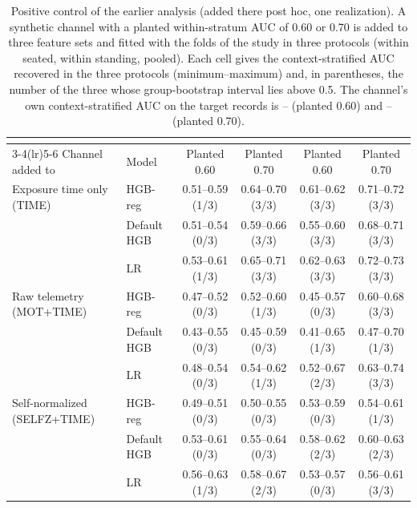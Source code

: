 \begin{table}[t]
\centering
\footnotesize
\caption{Positive control of the earlier analysis (added there post hoc, one realization). A synthetic channel with a planted within-stratum AUC of 0.60 or 0.70 is added to three feature sets and fitted with the folds of the study in three protocols (within seated, within standing, pooled). Each cell gives the context-stratified AUC recovered in the three protocols (minimum--maximum) and, in parentheses, the number of the three whose group-bootstrap interval lies above 0.5. The channel's own context-stratified AUC on the target records is -- (planted 0.60) and -- (planted 0.70).}
\label{tab:posctl}
\setlength{\tabcolsep}{4pt}
\begin{tabular}{@{}llcccc@{}}
\toprule
 & & \multicolumn{2}{c}{\sevtwo{}} & \multicolumn{2}{c}{\sevone{}} \\ \cmidrule(lr){3-4}\cmidrule(lr){5-6}
Channel added to & Model & Planted 0.60 & Planted 0.70 & Planted 0.60 & Planted 0.70 \\
\midrule
Exposure time only (TIME) & HGB-reg & 0.51--0.59 (1/3) & 0.64--0.70 (3/3) & 0.61--0.62 (3/3) & 0.71--0.72 (3/3) \\
 & Default HGB & 0.51--0.54 (0/3) & 0.59--0.66 (3/3) & 0.55--0.60 (3/3) & 0.68--0.71 (3/3) \\
 & LR & 0.53--0.61 (1/3) & 0.65--0.71 (3/3) & 0.62--0.63 (3/3) & 0.72--0.73 (3/3) \\
Raw telemetry (MOT+TIME) & HGB-reg & 0.47--0.52 (0/3) & 0.52--0.60 (1/3) & 0.45--0.57 (0/3) & 0.60--0.68 (3/3) \\
 & Default HGB & 0.43--0.55 (0/3) & 0.45--0.59 (0/3) & 0.41--0.65 (1/3) & 0.47--0.70 (1/3) \\
 & LR & 0.48--0.54 (0/3) & 0.54--0.62 (1/3) & 0.52--0.67 (2/3) & 0.63--0.74 (3/3) \\
Self-normalized (SELFZ+TIME) & HGB-reg & 0.49--0.51 (0/3) & 0.50--0.55 (0/3) & 0.53--0.59 (0/3) & 0.54--0.61 (1/3) \\
 & Default HGB & 0.53--0.61 (0/3) & 0.55--0.64 (0/3) & 0.58--0.62 (2/3) & 0.60--0.63 (2/3) \\
 & LR & 0.56--0.63 (1/3) & 0.58--0.67 (2/3) & 0.53--0.57 (0/3) & 0.56--0.61 (3/3) \\
\bottomrule
\end{tabular}
\end{table}
